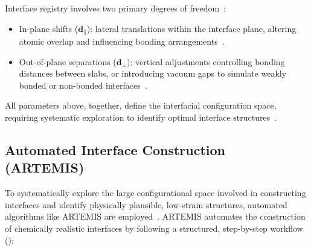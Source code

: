 Interface registry involves two primary degrees of freedom~\nocite{}:

\begin{itemize}
    \item In-plane shifts ($\mathbf{d}_{\parallel}$): lateral translations within the interface plane, altering atomic overlap and influencing bonding arrangements~\nocite{}.
    \item Out-of-plane separations ($\mathbf{d}_{\perp}$): vertical adjustments controlling bonding distances between slabs, or introducing vacuum gaps to simulate weakly bonded or non-bonded interfaces~\nocite{}.
\end{itemize}

All parameters above, together, define the interfacial configuration space, requiring systematic exploration to identify optimal interface structures~\nocite{}.

\subsection*{Automated Interface Construction (ARTEMIS)}\label{sec:artemis_algorithm}

To systematically explore the large configurational space involved in constructing interfaces and identify physically plausible, low-strain structures, automated algorithms like ARTEMIS are employed~\cite{artemis_paper}.
ARTEMIS automates the construction of chemically realistic interfaces by following a structured, step-by-step workflow ():

